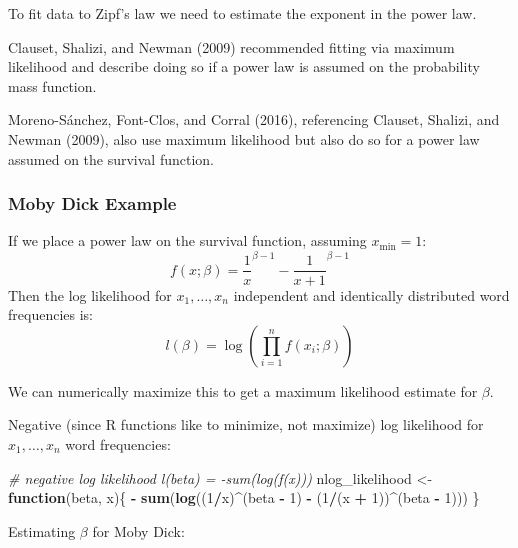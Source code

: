\documentclass[]{article}
\newenvironment{Shaded}{\begin{snugshade}}{\end{snugshade}}
\newcommand{\CommentTok}[1]{\textcolor[rgb]{0.56,0.35,0.01}{\textit{#1}}}
\newcommand{\ControlFlowTok}[1]{\textcolor[rgb]{0.13,0.29,0.53}{\textbf{#1}}}
\newcommand{\DecValTok}[1]{\textcolor[rgb]{0.00,0.00,0.81}{#1}}
\newcommand{\KeywordTok}[1]{\textcolor[rgb]{0.13,0.29,0.53}{\textbf{#1}}}
\newcommand{\NormalTok}[1]{#1}
\newcommand{\OperatorTok}[1]{\textcolor[rgb]{0.81,0.36,0.00}{\textbf{#1}}}
\newcommand{\StringTok}[1]{\textcolor[rgb]{0.31,0.60,0.02}{#1}}
\begin{document}
To fit data to Zipf's law we need to estimate the exponent in the power
law.

Clauset, Shalizi, and Newman (2009) recommended fitting via maximum
likelihood and describe doing so if a power law is assumed on the
probability mass function.

Moreno-Sánchez, Font-Clos, and Corral (2016), referencing Clauset,
Shalizi, and Newman (2009), also use maximum likelihood but also do so
for a power law assumed on the survival function.

\hypertarget{moby-dick-example}{%
\subsubsection{Moby Dick Example}\label{moby-dick-example}}

If we place a power law on the survival function, assuming
\(x_\text{min} = 1\): \[
f(x; \beta) = \frac{1}{x}^{\beta - 1} - \frac{1}{x + 1}^{\beta - 1}
\] Then the log likelihood for \(x_1, \ldots, x_n\) independent and
identically distributed word frequencies is: \[
l(\beta) =  \log \left( \prod_{i = 1}^{n} f(x_i; \beta) \right)
\]

We can numerically maximize this to get a maximum likelihood estimate
for \(\beta\).

Negative (since R functions like to minimize, not maximize) log
likelihood for \(x_1, \ldots, x_n\) word frequencies:

\begin{Shaded}
\begin{Highlighting}[]
\CommentTok{# negative log likelihood l(beta) = -sum(log(f(x)))}
\NormalTok{nlog_likelihood <-}\StringTok{ }\ControlFlowTok{function}\NormalTok{(beta, x)\{}
  \OperatorTok{-}\StringTok{ }\KeywordTok{sum}\NormalTok{(}\KeywordTok{log}\NormalTok{((}\DecValTok{1}\OperatorTok{/}\NormalTok{x)}\OperatorTok{^}\NormalTok{(beta }\OperatorTok{-}\StringTok{ }\DecValTok{1}\NormalTok{) }\OperatorTok{-}\StringTok{ }\NormalTok{(}\DecValTok{1}\OperatorTok{/}\NormalTok{(x }\OperatorTok{+}\StringTok{ }\DecValTok{1}\NormalTok{))}\OperatorTok{^}\NormalTok{(beta }\OperatorTok{-}\StringTok{ }\DecValTok{1}\NormalTok{)))}
\NormalTok{\}}
\end{Highlighting}
\end{Shaded}

Estimating \(\beta\) for Moby Dick:
\end{document}
